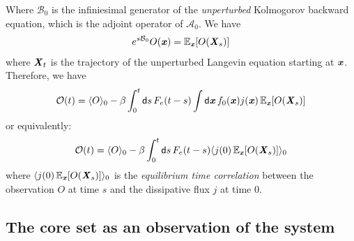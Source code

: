 \documentclass[aip,jcp,a4paper,reprint,onecolumn]{revtex4-1}
\newcommand{\vect}[1]{\textbf{\textit{#1}}}
\newcommand{\dd}{\textsf{d}}
\newcommand{\ml}{\mathcal L}
\newcommand{\fwg}{{\mathcal A}}
\newcommand{\bwg}{{\mathcal B}}
\begin{document}
Where $\bwg_0$ is the infiniesimal generator of the \emph{unperturbed} 
Kolmogorov backward equation, which is the adjoint operator of $\fwg_0$.
We have
\begin{align}
  e^{s\bwg_0} O(\vect x) = \mathbb E_{\vect x} [O(\vect X_s)]
\end{align}
where $\vect X_t$ is the trajectory of the unperturbed Langevin equation
starting at $\vect x$.
Therefore, we have
\begin{align}
  \mathcal O(t)
  =
  \langle O\rangle_0
  -
  \beta
  \int_0^t\dd s\,
  F_e(t-s)
  \int \dd \vect x\,
  f_0(\vect x)
  j(\vect x)\,
  \mathbb E_{\vect x} [O(\vect X_s)]
\end{align}
or equivalently:
\begin{align}\label{eqn:lr}
  \mathcal O(t)
  =
  \langle O\rangle_0
  -
  \beta
  \int_0^t\dd s\,
  F_e(t-s)
  \langle
  j(0)\,
  \mathbb E_{\vect x} [O(\vect X_s)]
  \rangle_0
\end{align}
where $  \langle
  j(0)\,
  \mathbb E_{\vect x} [O(\vect X_s)]
  \rangle_0$ is the \emph{equilibrium time
  correlation} between the observation $O$ at time $s$ and the
dissipative flux $j$ at time 0.


\subsection{The core set as an observation of the system}
\end{document}
